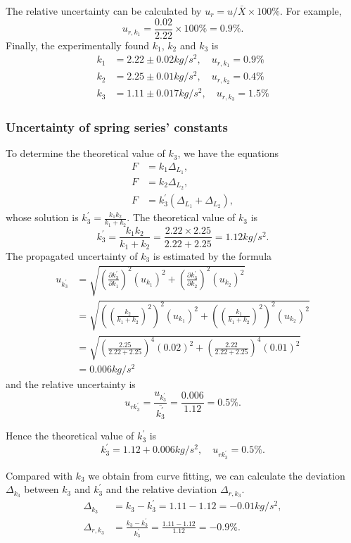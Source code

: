     The relative uncertainty can be calculated by $u_r=u/\bar{X}\times100\%$.
    For example,
    \[
        u_{r,k_1}=\frac{0.02}{2.22}\times100\%=0.9\%.
    \]
    Finally, the experimentally found $k_1$, $k_2$ and $k_3$ is
    \[
    \begin{split}
        k_1&= 2.22\pm 0.02 kg/s^2,\quad u_{r,k_1}=0.9\%\\
        k_2&= 2.25\pm 0.01 kg/s^2,\quad u_{r,k_2}=0.4\%\\
        k_3&= 1.11\pm 0.017kg/s^2,\quad u_{r,k_3}=1.5\%
    \end{split}
    \]

\subsubsection{Uncertainty of spring series' constants}
    To determine the theoretical value of $k_3$, we have the equations
    \[
    \begin{split}
        F&=k_1\Delta_{L_1},\\
        F&=k_2\Delta_{L_2},\\
        F&=k_3^{'}(\Delta_{L_1}+\Delta_{L_2}),
    \end{split}
    \]
    whose solution is $k_3^{'}=\frac{k_1k_2}{k_1+k_2}$. The theoretical value of $k_3$ is
    \[
        k_3^{'}=\frac{k_1k_2}{k_1+k_2}=\frac{2.22\times2.25}{2.22+2.25}=1.12kg/s^2.
    \]
    The propagated uncertainty of $k_3$ is estimated by the formula
    \[
    \begin{split}
        u_{k_3^{'}}&=\sqrt{(\frac{\partial k_3^{'}}{\partial k_1})^2(u_{k_1})^2+(\frac{\partial k_3^{'}}{\partial k_2})^2(u_{k_2})^2}\\[0.3cm]
        &=\sqrt{((\frac{k_2}{k_1+k_2})^2)^2(u_{k_1})^2+((\frac{k_1}{k_1+k_2})^2)^2(u_{k_2})^2}\\[0.3cm]
        &=\sqrt{(\frac{2.25}{2.22+2.25})^4(0.02)^2+(\frac{2.22}{2.22+2.25})^4(0.01)^2}\\[0.3cm]
        &=0.006kg/s^2
    \end{split}
    \]
    and the relative uncertainty is
    \[
        u_{rk_3^{'}}=\frac{u_{k_3^{'}}}{\overline{k_3^{'}}}=\frac{0.006}{1.12}=0.5\%.
    \]

    Hence the theoretical value of $k_3^{'}$ is
    \[
        k_3^{'}=1.12+0.006 kg/s^2,\quad u_{rk_3^{'}}=0.5\%.
    \]
    
    Compared with $k_3$ we obtain from curve fitting, we can calculate the deviation $\Delta_{k_3}$ between $k_3$ and $k_3^{'}$ and the relative deviation $\Delta_{r,k_3}$.
    \[ 
    \begin{split}
        \Delta_{k_3}&=k_3-k_3^{'}=1.11-1.12=-0.01kg/s^2,\\
        \Delta_{r,k_3}&=\frac{k_3-k_3^{'}}{k_3^{'}}=\frac{1.11-1.12}{1.12}=-0.9\%.
    \end{split}
    \]

